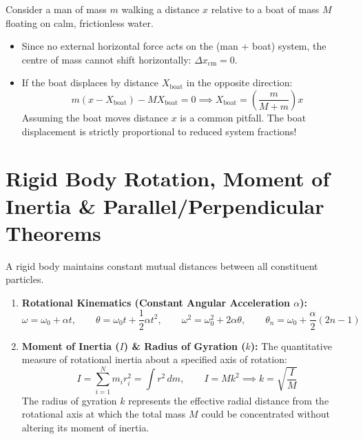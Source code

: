 \documentclass[10pt,a4paper]{article}
\begin{document}
\begin{trapbox}
Consider a man of mass $m$ walking a distance $x$ relative to a boat of mass $M$ floating on calm, frictionless water.
\begin{itemize}
  \item Since no external horizontal force acts on the (man + boat) system, the centre of mass cannot shift horizontally: $\Delta x_{\text{cm}} = 0$.
  \item If the boat displaces by distance $X_{\text{boat}}$ in the opposite direction:
  \begin{equation}
    m(x - X_{\text{boat}}) - M X_{\text{boat}} = 0 \implies X_{\text{boat}} = \left(\frac{m}{M + m}\right)x
  \end{equation}
  Assuming the boat moves distance $x$ is a common pitfall. The boat displacement is strictly proportional to reduced system fractions!
\end{itemize}
\end{trapbox}

\section{Rigid Body Rotation, Moment of Inertia \& Parallel/Perpendicular Theorems}

\begin{conceptbox}
A rigid body maintains constant mutual distances between all constituent particles.
\begin{enumerate}[leftmargin=*]
  \item \textbf{Rotational Kinematics (Constant Angular Acceleration $\alpha$):}
  \begin{equation}
    \omega = \omega_0 + \alpha t, \qquad \theta = \omega_0 t + \frac{1}{2}\alpha t^2, \qquad \omega^2 = \omega_0^2 + 2\alpha\theta, \qquad \theta_n = \omega_0 + \frac{\alpha}{2}(2n - 1)
  \end{equation}
  \item \textbf{Moment of Inertia ($I$) \& Radius of Gyration ($k$):} The quantitative measure of rotational inertia about a specified axis of rotation:
  \begin{equation}
    I = \sum_{i=1}^N m_i r_i^2 = \int r^2\,dm, \qquad I = M k^2 \implies k = \sqrt{\frac{I}{M}}
  \end{equation}
  The radius of gyration $k$ represents the effective radial distance from the rotational axis at which the total mass $M$ could be concentrated without altering its moment of inertia.
\end{enumerate}
\end{conceptbox}
\end{document}

